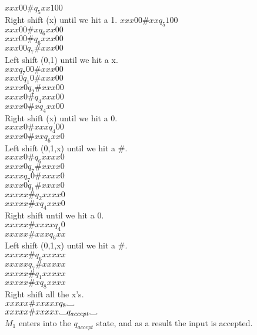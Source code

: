 \documentclass[12pt]{article}
\newcommand\Vtextvisiblespace[1][.8em]{%
	\mbox{\kern.07em\vrule height.3ex}%
	\vbox{\hrule width#1}%
	\hbox{\vrule height.3ex}}
\begin{document}
$xxx00 \#             q_5          xx100$ \\
Right shift (x) until we hit a 1.
$xxx00 \# xx          q_5            100$ \\
$xxx00 \# x           q_6           xx00$ \\
$xxx00 \#             q_6          xxx00$ \\
$xxx00                q_7       \# xxx00$ \\
Left shift (0,1) until we hit a x.        \\
$xxx                  q_7    00 \# xxx00$ \\
$xxx0                 q_1     0 \# xxx00$ \\
$xxxx0                q_2       \# xxx00$ \\
$xxxx0 \#             q_4          xxx00$ \\
$xxxx0 \# x           q_4           xx00$ \\
Right shift (x) until we hit a 0.         \\
$xxxx0 \# xxx         q_4             00$ \\
$xxxx0 \# xx          q_6            xx0$ \\
Left shift (0,1,x) until we hit a $\#$.  \\
$xxxx0 \#             q_6            xxxx0$ \\
$xxxx0                q_7        \#  xxxx0$ \\
$xxxx                 q_7      0 \#  xxxx0$ \\
$xxxx0                q_1        \#  xxxx0$ \\
$xxxxx \#             q_2            xxxx0$ \\
$xxxxx \# x           q_4             xxx0$ \\
Right shift until we hit a 0. \\
$xxxxx \# xxxx        q_4                0$ \\
$xxxxx \# xxx         q_6               xx$ \\
Left shift (0,1,x) until we hit a $\#$. \\
$xxxxx \#             q_6            xxxxx$ \\
$xxxxx                q_7        \#  xxxxx$ \\
$xxxxx \#             q_1            xxxxx$ \\
$xxxxx \# x           q_8             xxxx$ \\
Right shift all the x's. \\
$xxxxx \# xxxxx       q_8  \Vtextvisiblespace    $ \\
$xxxxx \# xxxxx  \Vtextvisiblespace  q_{accept} \Vtextvisiblespace $ \\
$M_1$ enters into the $q_{accept}$ state, and as a result the input is accepted. \\
\end{document}
